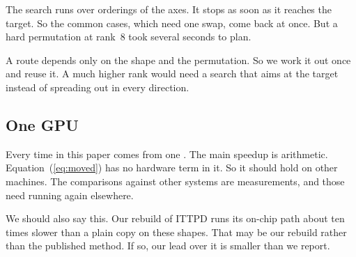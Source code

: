 The search runs over orderings of the axes. It stops as soon as it reaches the
target. So the common cases, which need one swap, come back at once. But a hard
permutation at rank~8 took several seconds to plan.

A route depends only on the shape and the permutation. So we work it out once
and reuse it. A much higher rank would need a search that aims at the target
instead of spreading out in every direction.

\subsection{One GPU}

Every time in this paper comes from one \resDevice{}. The main speedup is
arithmetic. Equation~(\ref{eq:moved}) has no hardware term in it. So it should
hold on other machines. The comparisons against other systems are
measurements, and those need running again elsewhere.

We should also say this. Our rebuild of ITTPD runs its on-chip path about ten
times slower than a plain copy on these shapes. That may be our rebuild rather
than the published method. If so, our lead over it is smaller than we report.
